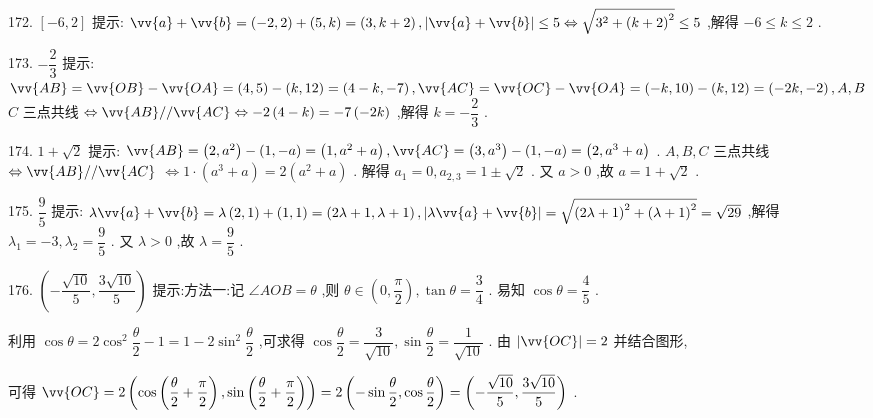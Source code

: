172. $\left\lbrack  {-6,2}\right\rbrack$ 提示: $\vv{a} + \vv{b} = \left( {-2,2}\right)  + \left( {5,k}\right)  = \left( {3,k + 2}\right) ,\left| {\vv{a} + \vv{b}}\right|  \leq  5 \Leftrightarrow  \sqrt{{3}^{2} + {\left( k + 2\right) }^{2}} \leq  5$ ,解得 $- 6 \leq  k \leq  2$ .

173. $- \dfrac{2}{3}$ 提示: $\vv{AB} = \vv{OB} - \vv{OA} = \left( {4,5}\right)  - \left( {k,{12}}\right)  = \left( {4 - k, - 7}\right) ,\vv{AC} = \vv{OC} - \vv{OA} = \left( {-k,{10}}\right)  - \left( {k,{12}}\right)  = \left( {-{2k}, - 2}\right) ,A,B$  $C$ 三点共线 $\Leftrightarrow  \vv{AB}//\vv{AC} \Leftrightarrow   - 2\left( {4 - k}\right)  =  - 7\left( {-{2k}}\right)$ ,解得 $k =  - \dfrac{2}{3}$ .

174. $1 + \sqrt{2}$ 提示: $\vv{AB} = \left( {2,{a}^{2}}\right)  - \left( {1, - a}\right)  = \left( {1,{a}^{2} + a}\right) ,\vv{AC} = \left( {3,{a}^{3}}\right)  - \left( {1, - a}\right)  = \left( {2,{a}^{3} + a}\right)$ . $A,B,C$ 三点共线 $\Leftrightarrow  \vv{AB}//\vv{AC}$  $\Leftrightarrow  1 \cdot  \left( {{a}^{3} + a}\right)  = 2\left( {{a}^{2} + a}\right)$ . 解得 ${a}_{1} = 0,{a}_{2,3} = 1 \pm  \sqrt{2}$ . 又 $a > 0$ ,故 $a = 1 + \sqrt{2}$ .

175. $\dfrac{9}{5}$ 提示: $\lambda \vv{a} + \vv{b} = \lambda \left( {2,1}\right)  + \left( {1,1}\right)  = \left( {{2\lambda } + 1,\lambda  + 1}\right) ,\left| {\lambda \vv{a} + \vv{b}}\right|  = \sqrt{{\left( 2\lambda  + 1\right) }^{2} + {\left( \lambda  + 1\right) }^{2}} = \sqrt{29}$ ,解得 ${\lambda }_{1} =  - 3,{\lambda }_{2} = \dfrac{9}{5}$ . 又 $\lambda  > 0$ ,故 $\lambda  = \dfrac{9}{5}$ .

176. $\left( {-\dfrac{\sqrt{10}}{5},\dfrac{3\sqrt{10}}{5}}\right)$ 提示:方法一:记 $\angle {AOB} = \theta$ ,则 $\theta  \in  \left( {0,\dfrac{\pi }{2}}\right) ,\tan \theta  = \dfrac{3}{4}$ . 易知 $\cos \theta  = \dfrac{4}{5}$ .

利用 $\cos \theta  = 2{\cos }^{2}\dfrac{\theta }{2} - 1 = 1 - 2{\sin }^{2}\dfrac{\theta }{2}$ ,可求得 $\cos \dfrac{\theta }{2} = \dfrac{3}{\sqrt{10}},\sin \dfrac{\theta }{2} = \dfrac{1}{\sqrt{10}}$ . 由 $\left| \vv{OC}\right|  = 2$ 并结合图形,

可得 $\vv{OC} = 2\left( {\cos \left( {\dfrac{\theta }{2} + \dfrac{\pi }{2}}\right) ,\sin \left( {\dfrac{\theta }{2} + \dfrac{\pi }{2}}\right) }\right)  = 2\left( {-\sin \dfrac{\theta }{2},\cos \dfrac{\theta }{2}}\right)  = \left( {-\dfrac{\sqrt{10}}{5},\dfrac{3\sqrt{10}}{5}}\right)$ .

